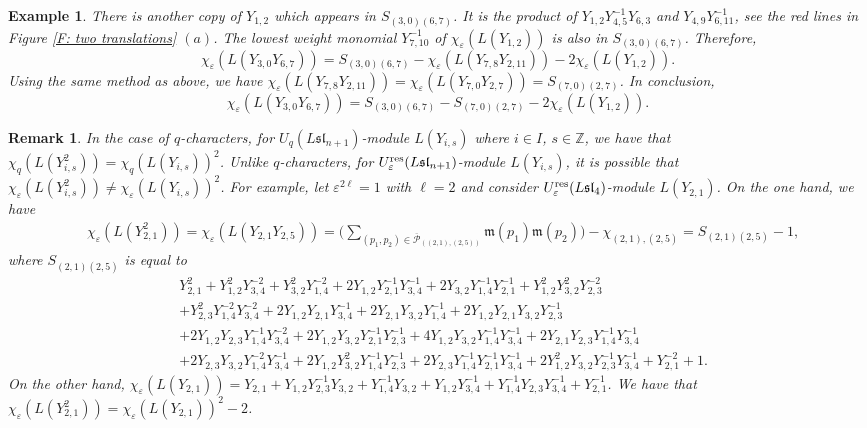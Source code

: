 \documentclass[12pt, reqno]{amsart}
\newtheorem{remark}[theorem]{Remark}
\newtheorem{example}[theorem]{Example}
\numberwithin{equation}{section}
\newcommand{\ZZ}{\mathbb{Z}}
\newcommand{\res}{{\rm res}}
\begin{document}
{\begin{example}
There is another copy of $Y_{1,2}$ which appears in $S_{(3,0)(6,7)}$. It is the product of $Y_{1,2}Y_{4,5}^{-1}Y_{6,3}$ and $Y_{4,9}Y_{6,11}^{-1}$, see the red lines in Figure \ref{F:  two translations} $(a)$. The lowest weight monomial $Y_{7,10}^{-1}$ of $\chi_{\varepsilon}(L(Y_{1,2}))$ is also in $S_{(3,0)(6,7)}$. Therefore,
\[
\chi_\varepsilon(L(Y_{3,0}Y_{6,7}))=S_{(3,0)(6,7)}-\chi_{\varepsilon}(L(Y_{7,8}Y_{2,11}))-2\chi_{\varepsilon}(L(Y_{1,2})).
\]
Using the same method as above, we have $\chi_\varepsilon(L(Y_{7,8}Y_{2,11}))=\chi_\varepsilon(L(Y_{7,0}Y_{2,7}))=S_{(7,0)(2,7)}$.
In conclusion,
\[
\chi_\varepsilon(L(Y_{3,0}Y_{6,7}))=S_{(3,0)(6,7)}-S_{(7,0)(2,7)}-2\chi_{\varepsilon}(L(Y_{1,2})).
\]
\end{example}

\begin{remark}
In the case of $q$-characters, for $U_q(L\mathfrak{sl}_{n+1})$-module $L(Y_{i,s})$ where $i \in I$, $s \in \ZZ$, we have that $\chi_q(L(Y_{i,s}^2))=\chi_q(L(Y_{i,s}))^2$. Unlike $q$-characters, for $U_{\varepsilon}^{\res}(L\mathfrak{sl}_{n+1})$-module $L(Y_{i,s})$, it is possible that $\chi_\varepsilon(L(Y_{i,s}^2)) \ne \chi_\varepsilon(L(Y_{i,s}))^2$. For example, let $\varepsilon^{2 \ell}=1$ with $\ell=2$ and consider $U_{\varepsilon}^{\res}({L\mathfrak{sl}_{4}})$-module $L(Y_{2,1})$. On the one hand, we have
\begin{align*}
&\chi_{\varepsilon}(L(Y_{2,1}^2))=\chi_{\varepsilon}(L(Y_{2,1}Y_{2,5}))=\big(\sum_{(p_{1},p_{2}) \in \overline{\mathscr{P}}_{((2,1),(2,5))}} \mathfrak{m}(p_1)\mathfrak{m}(p_2)\big)-\chi_{(2,1), (2,5)}=S_{(2,1)(2,5)}-1,
\end{align*}
where $S_{(2,1)(2,5)}$ is equal to
\begin{align*} 
&Y_{2,1}^2+Y_{1,2}^2Y_{3,4}^{-2}+Y_{3,2}^2Y_{1,4}^{-2}+ 2Y_{1,2}Y_{2,1}^{-1}Y_{3,4}^{-1} + 2Y_{3,2}Y_{1,4}^{-1}Y_{2,1}^{-1}+Y_{1,2}^2Y_{3,2}^2Y_{2,3}^{-2} \\
& + Y_{2,3}^2Y_{1,4}^{-2}Y_{3,4}^{-2} +2Y_{1,2}Y_{2,1}Y_{3,4}^{-1}+2Y_{2,1}Y_{3,2}Y_{1,4}^{-1}+2Y_{1,2}Y_{2,1}Y_{3,2}Y_{2,3}^{-1} \\
& +2Y_{1,2}Y_{2,3}Y_{1,4}^{-1}Y_{3,4}^{-2}+2Y_{1,2}Y_{3,2}Y_{2,1}^{-1}Y_{2,3}^{-1} +4Y_{1,2}Y_{3,2}Y_{1,4}^{-1}Y_{3,4}^{-1} + 2Y_{2,1}Y_{2,3}Y_{1,4}^{-1}Y_{3,4}^{-1} \\
& +2Y_{2,3}Y_{3,2}Y_{1,4}^{-2}Y_{3,4}^{-1} +2Y_{1,2}Y_{3,2}^2Y_{1,4}^{-1}Y_{2,3}^{-1} +2Y_{2,3}Y_{1,4}^{-1}Y_{2,1}^{-1}Y_{3,4}^{-1}+2Y_{1,2}^2Y_{3,2}Y_{2,3}^{-1}Y_{3,4}^{-1}+Y_{2,1}^{-2} + 1.
\end{align*}
On the other hand, $\chi_{\varepsilon}(L(Y_{2,1})) =Y_{2,1}+Y_{1,2}Y^{-1}_{2, 3}Y_{3,2}+Y_{1, 4}^{-1}Y_{3,2}+Y_{1,2}Y_{3, 4}^{-1}+Y_{1, 4}^{-1}Y_{2,3}Y_{3, 4}^{-1}+Y_{2, 1}^{-1}$. We have that $\chi_{\varepsilon}(L(Y_{2,1}^2))=\chi_{\varepsilon}(L(Y_{2,1}))^2-2$.
\end{remark}


}
\end{document}
